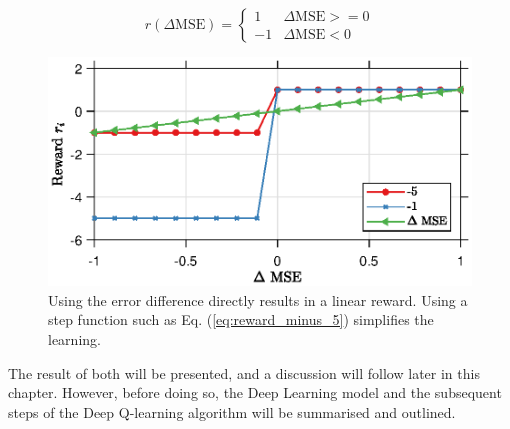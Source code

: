 \begin{equation}\label{eq:reward_minus_1}
r(\Delta \text{MSE}) = \begin{cases}
1 &\Delta \text{MSE} >= 0\\
-1 &\Delta \text{MSE} < 0
\end{cases}
\end{equation}

\begin{figure}
    \centering
    \includegraphics{chapters/part_uplink/figures/reward_example_figure.eps}
    \caption{Using the error difference directly results in a linear reward. Using a step function such as Eq. (\ref{eq:reward_minus_5}) simplifies the learning.}
    \label{fig:reward_example_figure}
\end{figure}

The result of both will be presented, and a discussion will follow later in this chapter. However, before doing so, the Deep Learning model and the subsequent steps of the Deep Q-learning algorithm will be summarised and outlined.

